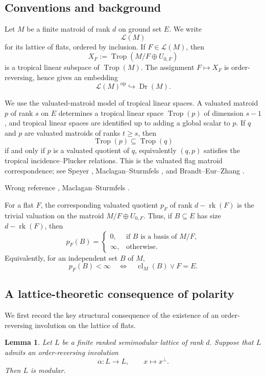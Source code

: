 \documentclass[12pt]{article}
\newcommand{\Trop}{\operatorname{Trop}}
\newcommand{\Dr}{\operatorname{Dr}}
\newcommand{\rk}{\operatorname{rk}}
\newcommand{\cl}{\operatorname{cl}}
\newcommand{\cL}{\mathcal L}
\theoremstyle{plain}
\newtheorem{lemma}[theorem]{Lemma}
\theoremstyle{definition}
\newcommand{\review}[1]{\begin{reviewbox}#1\end{reviewbox}}
\begin{document}
\subsection{Conventions and background}

Let \(M\) be a finite matroid of rank \(d\) on ground set \(E\).  We write
\[
  \cL(M)
\]
for its lattice of flats, ordered by inclusion.  If \(F\in \cL(M)\), then
\[
  X_F:=\Trop(M/F\oplus U_{0,F})
\]
is a tropical linear subspace of \(\Trop(M)\).  The assignment \(F\mapsto X_F\) is order-reversing, hence gives an embedding
\[
   \cL(M)^{\operatorname{op}}\hookrightarrow \Dr(M).
\]

We use the valuated-matroid model of tropical linear spaces.  A valuated matroid \(p\) of rank \(s\) on \(E\) determines a tropical linear space \(\Trop(p)\) of dimension \(s-1\), and tropical linear spaces are identified up to adding a global scalar to \(p\).  If \(q\) and \(p\) are valuated matroids of ranks \(t\ge s\), then
\[
   \Trop(p)\subseteq \Trop(q)
\]
if and only if \(p\) is a valuated quotient of \(q\), equivalently \((q,p)\) satisfies the tropical incidence--Plucker relations.  This is the valuated flag matroid correspondence; see Speyer \cite{SpeyerTLS}, Maclagan--Sturmfels \cite[Ch.~4]{MS}, and Brandt--Eur--Zhang \cite{BEZ}.
\review{Wrong reference \cite{SpeyerTLS}, Maclagan--Sturmfels \cite[Ch.~4]{MS}.}


For a flat \(F\), the corresponding valuated quotient \(p_F\) of rank \(d-\rk(F)\) is the trivial valuation on the matroid \(M/F\oplus U_{0,F}\).  Thus, if \(B\subseteq E\) has size \(d-\rk(F)\), then
\[
   p_F(B)=
   \begin{cases}
   0, & \text{if } B \text{ is a basis of }M/F,\\
   \infty, & \text{otherwise}.
   \end{cases}
\]
Equivalently, for an independent set \(B\) of \(M\),
\[
   p_F(B)<\infty
   \quad\Longleftrightarrow\quad
   \cl_M(B)\vee F=E.
\]

\subsection{A lattice-theoretic consequence of polarity}

We first record the key structural consequence of the existence of an order-reversing involution on the lattice of flats.

\begin{lemma}\label{lem:selfdual-implies-modular}
Let \(L\) be a finite ranked semimodular lattice of rank \(d\).  Suppose that \(L\) admits an order-reversing involution
\[
   \alpha:L\longrightarrow L,\qquad x\longmapsto x^\perp .
\]
Then \(L\) is modular.
\end{lemma}
\end{document}
